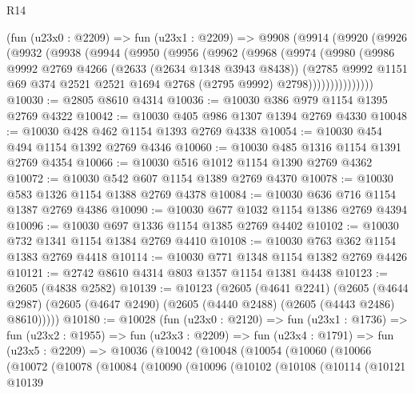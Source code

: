 \begin{lexlean}{R14}
\begin{coremodule}
    (fun (u23x0 : @2209) =>
    fun (u23x1 : @2209) =>
    @9908
      (@9914
        (@9920
          (@9926
            (@9932
              (@9938
                (@9944
                  (@9950
                    (@9956
                      (@9962
                        (@9968
                          (@9974
                            (@9980
                              (@9986
                                @9992
                                @2769
                                @4266
                                (@2633 (@2634 @1348 @3943 @8438))
                                (@2785
                                  @9992
                                  @1151
                                  @69
                                  @374
                                  @2521
                                  @2521
                                  @1694
                                  @2768
                                  (@2795 @9992)
                                  @2798)))))))))))))))
@10030 := @2805 @8610 @4314
@10036 := @10030 @386 @979 @1154 @1395 @2769 @4322
@10042 := @10030 @405 @986 @1307 @1394 @2769 @4330
@10048 := @10030 @428 @462 @1154 @1393 @2769 @4338
@10054 := @10030 @454 @494 @1154 @1392 @2769 @4346
@10060 := @10030 @485 @1316 @1154 @1391 @2769 @4354
@10066 := @10030 @516 @1012 @1154 @1390 @2769 @4362
@10072 := @10030 @542 @607 @1154 @1389 @2769 @4370
@10078 := @10030 @583 @1326 @1154 @1388 @2769 @4378
@10084 := @10030 @636 @716 @1154 @1387 @2769 @4386
@10090 := @10030 @677 @1032 @1154 @1386 @2769 @4394
@10096 := @10030 @697 @1336 @1154 @1385 @2769 @4402
@10102 := @10030 @732 @1341 @1154 @1384 @2769 @4410
@10108 := @10030 @763 @362 @1154 @1383 @2769 @4418
@10114 := @10030 @771 @1348 @1154 @1382 @2769 @4426
@10121 := @2742 @8610 @4314 @803 @1357 @1154 @1381 @4438
@10123 := @2605 (@4838 @2582)
@10139 := @10123
    (@2605
      (@4641 @2241)
      (@2605 (@4644 @2987) (@2605 (@4647 @2490) (@2605 (@4440 @2488) (@2605 (@4443 @2486) @8610)))))
@10180 := @10028
    (fun (u23x0 : @2120) =>
    fun (u23x1 : @1736) =>
    fun (u23x2 : @1955) =>
    fun (u23x3 : @2209) =>
    fun (u23x4 : @1791) =>
    fun (u23x5 : @2209) =>
    @10036
      (@10042
        (@10048
          (@10054
            (@10060
              (@10066
                (@10072
                  (@10078
                    (@10084
                      (@10090
                        (@10096
                          (@10102
                            (@10108
                              (@10114
                                (@10121
                                  @10139

\end{coremodule}
\end{lexlean}
